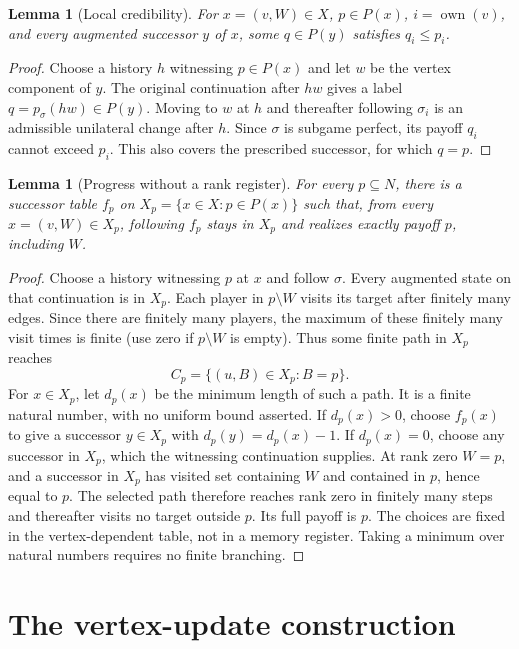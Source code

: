 \documentclass[acmlarge,11pt,screen,nonacm,natbib=false]{acmart}
\newcommand{\own}{\operatorname{own}}
\newtheorem{lemma}[theorem]{Lemma}
\theoremstyle{remark}
\begin{document}
\begin{lemma}[Local credibility]\label{lem:local}
For $x=(v,W)\in X$, $p\in P(x)$, $i=\own(v)$, and every augmented
successor $y$ of $x$, some $q\in P(y)$ satisfies $q_i\leq p_i$.
\end{lemma}
\begin{proof}
Choose a history $h$ witnessing $p\in P(x)$ and let $w$ be the vertex
component of $y$. The original continuation after $hw$ gives a label
$q=p_\sigma(hw)\in P(y)$. Moving to $w$ at $h$ and thereafter following
$\sigma_i$ is an admissible unilateral change after $h$. Since $\sigma$
is subgame perfect, its payoff $q_i$ cannot exceed $p_i$.
This also covers the prescribed successor, for which $q=p$.
\end{proof}

\begin{lemma}[Progress without a rank register]\label{lem:progress}
For every $p\subseteq N$, there is a successor table $f_p$ on
$X_p=\{x\in X:p\in P(x)\}$ such that, from every $x=(v,W)\in X_p$,
following $f_p$ stays in $X_p$ and realizes exactly payoff $p$, including $W$.
\end{lemma}
\begin{proof}
Choose a history witnessing $p$ at $x$ and follow $\sigma$. Every augmented
state on that continuation is in $X_p$. Each player in $p\setminus W$
visits its target after finitely many edges. Since there are finitely many
players, the maximum of these finitely many visit times is finite (use zero
if $p\setminus W$ is empty).
Thus some finite path in $X_p$ reaches
\[
                  C_p=\{(u,B)\in X_p:B=p\}.
\]
For $x\in X_p$, let $d_p(x)$ be the minimum length of such a path.
It is a finite natural number, with no uniform bound asserted. If
$d_p(x)>0$, choose $f_p(x)$ to give a successor $y\in X_p$ with
$d_p(y)=d_p(x)-1$. If $d_p(x)=0$, choose any successor in $X_p$, which
the witnessing continuation supplies. At rank zero $W=p$, and a successor
in $X_p$ has visited set containing $W$ and contained in $p$, hence equal
to $p$. The selected path therefore reaches rank zero in finitely many
steps and thereafter visits no target outside $p$. Its full payoff is $p$.
The choices are fixed in the vertex-dependent table, not in a memory
register. Taking a minimum over natural numbers requires no finite branching.
\end{proof}

\section{The vertex-update construction}\label{sec:machine}
\end{document}
